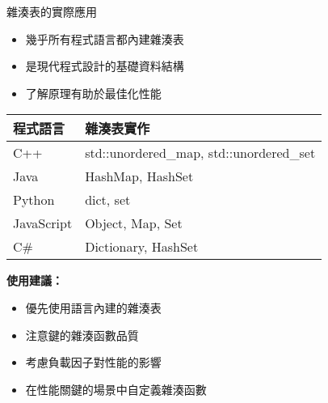 \documentclass{beamer}
\begin{document}
\begin{frame}{雜湊表的實際應用}
\begin{itemize}
    \item 幾乎所有程式語言都內建雜湊表
    \item 是現代程式設計的基礎資料結構
    \item 了解原理有助於最佳化性能
\end{itemize}

\vspace{1em}
\begin{center}
\renewcommand{\arraystretch}{1.3}
\begin{tabular}{|>{\centering\arraybackslash}m{2.5cm}|>{\raggedright\arraybackslash}m{6cm}|}
\hline
\textbf{程式語言} & \textbf{雜湊表實作} \\
\hline
C++ & std::unordered\_map, std::unordered\_set \\
\hline
Java & HashMap, HashSet \\
\hline
Python & dict, set \\
\hline
JavaScript & Object, Map, Set \\
\hline
C\# & Dictionary, HashSet \\
\hline
\end{tabular}
\end{center}

\vspace{1em}
\textbf{使用建議：}
\begin{itemize}
    \item 優先使用語言內建的雜湊表
    \item 注意鍵的雜湊函數品質
    \item 考慮負載因子對性能的影響
    \item 在性能關鍵的場景中自定義雜湊函數
\end{itemize}
\end{frame}
\end{document}
